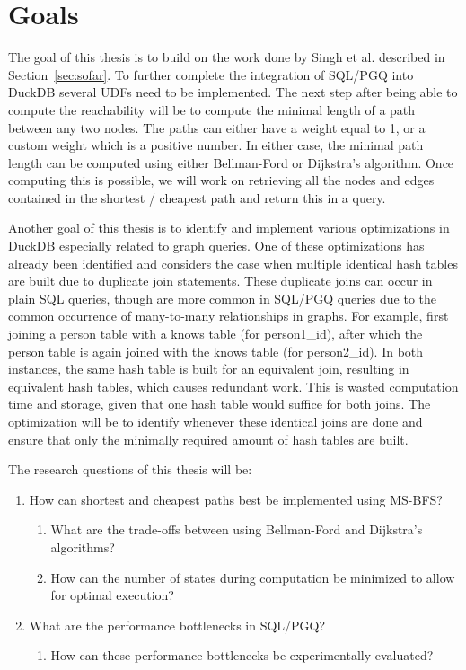 \section{Goals}\label{sec:goals}
The goal of this thesis is to build on the work done by Singh et al. described in Section~\ref{sec:sofar}.
To further complete the integration of SQL/PGQ into DuckDB several UDFs need to be implemented. 
The next step after being able to compute the reachability will be to compute the minimal length of a path between any two nodes. 
The paths can either have a weight equal to 1, or a custom weight which is a positive number. 
In either case, the minimal path length can be computed using either Bellman-Ford or Dijkstra's algorithm. 
Once computing this is possible, we will work on retrieving all the nodes and edges contained in the shortest / cheapest path and return this in a query.

Another goal of this thesis is to identify and implement various optimizations in DuckDB especially related to graph queries. 
One of these optimizations has already been identified and considers the case when multiple identical hash tables are built due to duplicate join statements.
These duplicate joins can occur in plain SQL queries, though are more common in SQL/PGQ queries due to the common occurrence of many-to-many relationships in graphs.
For example, first joining a person table with a knows table (for person1\_id), after which the person table is again joined with the knows table (for person2\_id). 
In both instances, the same hash table is built for an equivalent join, resulting in equivalent hash tables, which causes redundant work. 
This is wasted computation time and storage, given that one hash table would suffice for both joins.  
The optimization will be to identify whenever these identical joins are done and ensure that only the minimally required amount of hash tables are built. 

The research questions of this thesis will be: 
\begin{enumerate}
    \item How can shortest and cheapest paths best be implemented using MS-BFS?
    \begin{enumerate}
        \item What are the trade-offs between using Bellman-Ford and Dijkstra's algorithms?
        \item How can the number of states during computation be minimized to allow for optimal execution? 
    \end{enumerate}
    \item What are the performance bottlenecks in SQL/PGQ?
    \begin{enumerate}
        \item How can these performance bottlenecks be experimentally evaluated? 
    \end{enumerate}
\end{enumerate}

